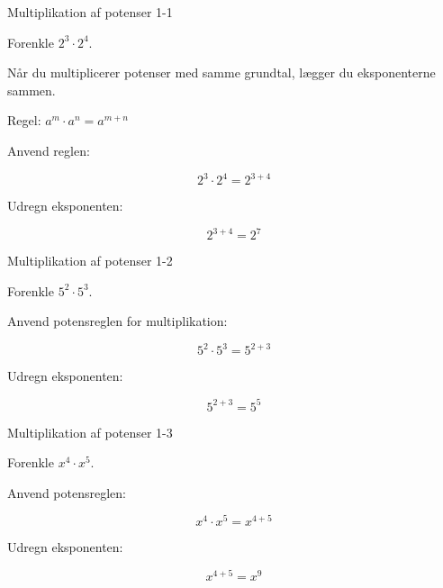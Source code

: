 \documentclass{article}
\begin{document}

\tableofcontents
\newpage

\begin{exercise}{Multiplikation af potenser 1-1}

Forenkle $2^3 \cdot 2^4$.


\hint

Når du multiplicerer potenser med samme grundtal, lægger du eksponenterne sammen.

\hint

Regel: $a^m \cdot a^n = a^{m+n}$

\hint

Anvend reglen:

\hint
\[
2^3 \cdot 2^4 = 2^{3+4}
\]

\hint

Udregn eksponenten:

\hint
\[
2^{3+4} = 2^7
\]

\end{exercise}

\newpage

\begin{exercise}{Multiplikation af potenser 1-2}

Forenkle $5^2 \cdot 5^3$.


\hint

Anvend potensreglen for multiplikation:

\hint
\[
5^2 \cdot 5^3 = 5^{2+3}
\]

\hint

Udregn eksponenten:

\hint
\[
5^{2+3} = 5^5
\]

\end{exercise}

\newpage

\begin{exercise}{Multiplikation af potenser 1-3}

Forenkle $x^4 \cdot x^5$.


\hint

Anvend potensreglen:

\hint
\[
x^4 \cdot x^5 = x^{4+5}
\]

\hint

Udregn eksponenten:

\hint
\[
x^{4+5} = x^9
\]

\end{exercise}
\end{document}
